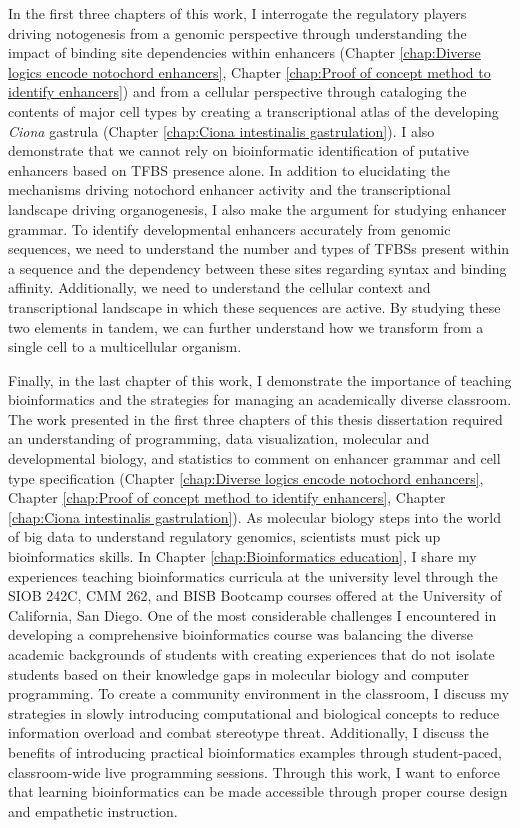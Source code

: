 \begin{dissertationepilogue}
    In the first three chapters of this work, I interrogate the regulatory players driving notogenesis from a genomic perspective through understanding the impact of binding site dependencies within enhancers (Chapter \ref{chap:Diverse logics encode notochord enhancers}, Chapter \ref{chap:Proof of concept method to identify enhancers}) and from a cellular perspective through cataloging the contents of major cell types by creating a transcriptional atlas of the developing \textit{Ciona} gastrula (Chapter \ref{chap:Ciona intestinalis gastrulation}). I also demonstrate that we cannot rely on bioinformatic identification of putative enhancers based on TFBS presence alone. In addition to elucidating the mechanisms driving notochord enhancer activity and the transcriptional landscape driving organogenesis, I also make the argument for studying enhancer grammar. To identify developmental enhancers accurately from genomic sequences, we need to understand the number and types of TFBSs present within a sequence and the dependency between these sites regarding syntax and binding affinity. Additionally, we need to understand the cellular context and transcriptional landscape in which these sequences are active. By studying these two elements in tandem, we can further understand how we transform from a single cell to a multicellular organism. 

    Finally, in the last chapter of this work, I demonstrate the importance of teaching bioinformatics and the strategies for managing an academically diverse classroom. The work presented in the first three chapters of this thesis dissertation required an understanding of programming, data visualization, molecular and developmental biology, and statistics to comment on enhancer grammar and cell type specification (Chapter \ref{chap:Diverse logics encode notochord enhancers}, Chapter \ref{chap:Proof of concept method to identify enhancers}, Chapter \ref{chap:Ciona intestinalis gastrulation}). As molecular biology steps into the world of big data to understand regulatory genomics, scientists must pick up bioinformatics skills. In Chapter \ref{chap:Bioinformatics education}, I share my experiences teaching bioinformatics curricula at the university level through the SIOB 242C, CMM 262, and BISB Bootcamp courses offered at the University of California, San Diego. One of the most considerable challenges I encountered in developing a comprehensive bioinformatics course was balancing the diverse academic backgrounds of students with creating experiences that do not isolate students based on their knowledge gaps in molecular biology and computer programming. To create a community environment in the classroom, I discuss my strategies in slowly introducing computational and biological concepts to reduce information overload and combat stereotype threat. Additionally, I discuss the benefits of introducing practical bioinformatics examples through student-paced, classroom-wide live programming sessions. Through this work, I want to enforce that learning bioinformatics can be made accessible through proper course design and empathetic instruction.


\end{dissertationepilogue}
